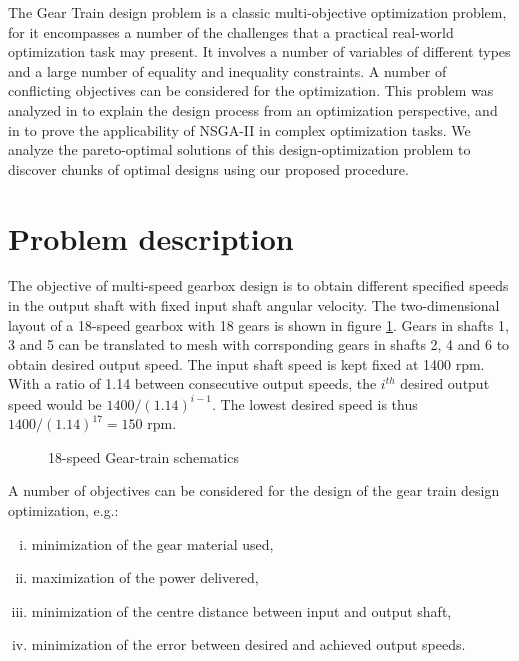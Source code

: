 The Gear Train design problem is a classic multi-objective optimization
problem, for it encompasses a number of the challenges that a practical
real-world optimization task may present. It involves a number of variables
of different types and a large number of equality and inequality
constraints. A number of conflicting objectives can be considered for the
optimization. This problem was analyzed in \cite{agogino1990} to explain
the design process from an optimization perspective, and in \cite{debgt} to
prove the applicability of NSGA-II in complex optimization tasks. We
analyze the pareto-optimal solutions of this design-optimization problem to
discover chunks of optimal designs using our proposed procedure.


\section{Problem description}
\label{problem}
The objective of multi-speed gearbox design is to obtain different
specified speeds in the output shaft with fixed input shaft angular
velocity. The two-dimensional layout of a 18-speed gearbox with 18 gears is
shown in figure \ref{geartrain}. Gears in shafts 1, 3 and 5 can be
translated to mesh with corrsponding gears in shafts 2, 4 and 6 to obtain
desired output speed. The input shaft speed is kept fixed at 1400 rpm. With
a ratio of 1.14 between consecutive output speeds, the $i^{th}$ desired
output speed would be $1400/(1.14)^{i-1}$.  The lowest desired speed is
thus $1400/(1.14)^{17} = 150$ rpm.

\begin{figure}[ht]\begin{center}
 \caption{18-speed Gear-train schematics}
 \label{geartrain}
\end{center}\end{figure}

A number of objectives can be considered for the design of the gear 
train design optimization, e.g.:

\begin{enumerate}[(i)]
\item minimization of the gear material used,
\item maximization of the power delivered, 
\item minimization of the centre distance between input and output 
shaft,
\item minimization of the error between desired and achieved output 
speeds.
\end{enumerate}

